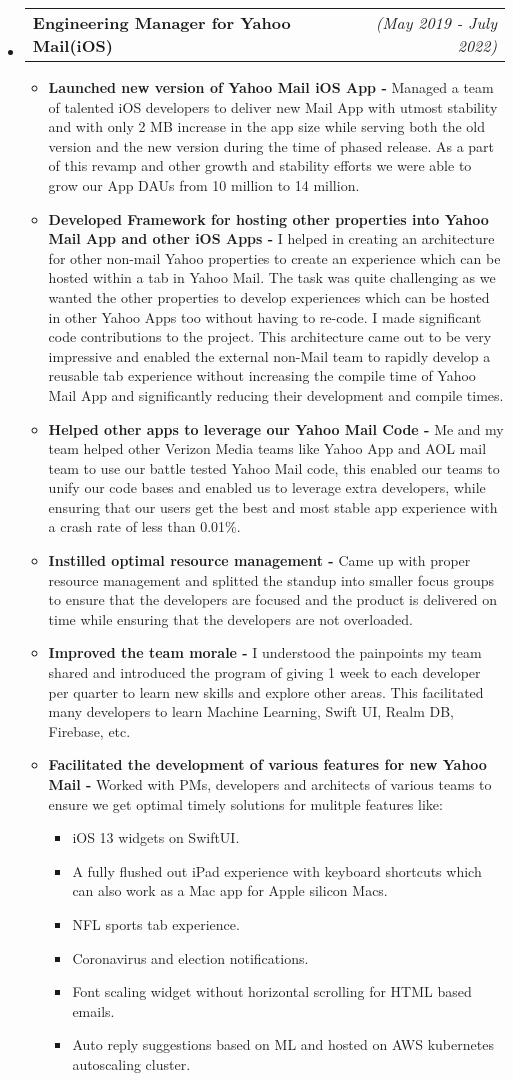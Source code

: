 \documentclass[a4paper,11pt,times]{res}
\makeatletter
\newcommand{\smalitem}[1]{\item #1 \vspace{-4pt}}
\newcommand{\mysubheading}[2]{
\begin{tabular*}{172mm}{l@{\extracolsep{\fill}}r}
		\textbf{#1} & \textit{#2} \\
\end{tabular*}\vspace{-1pt}}
\makeatother
\begin{document}
\begin{itemize}
\item
\mysubheading{Engineering Manager for Yahoo Mail(iOS) }{(May 2019 - July 2022)}
\begin{itemize}
\vspace{-2pt}
\smalitem{\textbf{Launched new version of Yahoo Mail iOS App -} Managed a team of talented iOS developers to deliver new Mail App with utmost stability and with only 2 MB increase in the app size while serving both the old version and the new version during the time of phased release. As a part of this revamp and other growth and stability efforts we were able to grow our App DAUs from 10 million to 14 million.}
\smalitem{\textbf{Developed Framework for hosting other properties into Yahoo Mail App and other iOS Apps -} I helped in creating an architecture for other non-mail Yahoo properties to create an experience which can be hosted within a tab in Yahoo Mail. The task was quite challenging as we wanted the other properties to develop experiences which can be hosted in other Yahoo Apps too without having to re-code. I made significant code contributions to the project. This architecture came out to be very impressive and enabled the external non-Mail team to rapidly develop a reusable tab experience without increasing the compile time of Yahoo Mail App and significantly reducing their development and compile times.}
\smalitem{\textbf{Helped other apps to leverage our Yahoo Mail Code -} Me and my team helped other Verizon Media teams like Yahoo App and AOL mail team to use our battle tested Yahoo Mail code, this enabled our teams to unify our code bases and enabled us to leverage extra developers, while ensuring that our users get the best and most stable app experience with a crash rate of less than 0.01\%. }
\smalitem{\textbf{Instilled optimal resource management -} Came up with proper resource management and splitted the standup into smaller focus groups to ensure that the developers are focused and the product is delivered on time while ensuring that the developers are not overloaded.}
\smalitem{\textbf{Improved the team morale -} I understood the painpoints my team shared and introduced the program of giving 1 week to each developer per quarter to learn new skills and explore other areas. This facilitated many developers to learn Machine Learning, Swift UI, Realm DB, Firebase, etc.}
\smalitem{\textbf{Facilitated the development of various features for new Yahoo Mail -} Worked with PMs, developers and architects of various teams to ensure we get optimal timely solutions for mulitple features like:
\begin{itemize}
\smalitem {iOS 13 widgets on SwiftUI.}
\smalitem {A fully flushed out iPad experience with keyboard shortcuts which can also work as a Mac app for Apple silicon Macs.}
\smalitem {NFL sports tab experience.}
\smalitem {Coronavirus and election notifications.}
\smalitem {Font scaling widget without horizontal scrolling for HTML based emails.}
\smalitem {Auto reply suggestions based on ML and hosted on AWS kubernetes autoscaling cluster.}
\end{itemize}
 }


\end{itemize}
\end{itemize}
\end{document}
